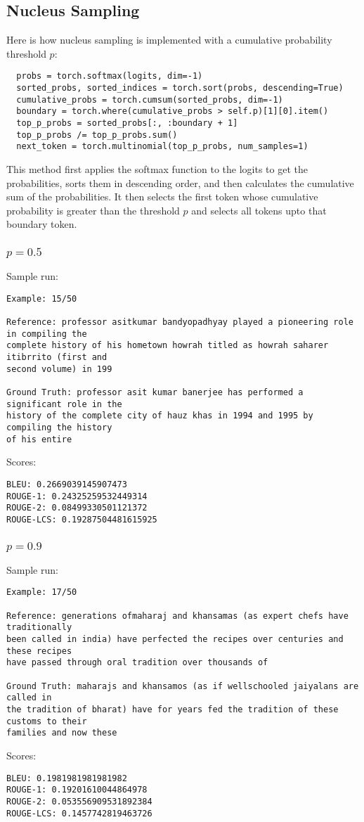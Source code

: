 \documentclass[a4paper,12pt]{article}
\begin{document}
\subsection{Nucleus Sampling}
Here is how nucleus sampling is implemented with a cumulative probability threshold $p$:
\begin{verbatim}
  probs = torch.softmax(logits, dim=-1)
  sorted_probs, sorted_indices = torch.sort(probs, descending=True)
  cumulative_probs = torch.cumsum(sorted_probs, dim=-1)
  boundary = torch.where(cumulative_probs > self.p)[1][0].item()
  top_p_probs = sorted_probs[:, :boundary + 1]
  top_p_probs /= top_p_probs.sum()  
  next_token = torch.multinomial(top_p_probs, num_samples=1)
\end{verbatim}
This method first applies the softmax function to the logits to get the probabilities,
sorts them in descending order, and then calculates the cumulative sum of the probabilities.
It then selects the first token whose cumulative probability is greater than the threshold $p$ and selects all tokens upto that boundary token.

\subsubsection{$p = 0.5$}
Sample run:
\begin{verbatim}
Example: 15/50

Reference: professor asitkumar bandyopadhyay played a pioneering role in compiling the
complete history of his hometown howrah titled as howrah saharer itibrrito (first and 
second volume) in 199

Ground Truth: professor asit kumar banerjee has performed a significant role in the
history of the complete city of hauz khas in 1994 and 1995 by compiling the history
of his entire

\end{verbatim}
Scores:
\begin{verbatim}
BLEU: 0.2669039145907473
ROUGE-1: 0.24325259532449314
ROUGE-2: 0.08499330501121372
ROUGE-LCS: 0.19287504481615925
\end{verbatim}

\subsubsection{$p = 0.9$}
Sample run:
\begin{verbatim}
Example: 17/50

Reference: generations ofmaharaj and khansamas (as expert chefs have traditionally
been called in india) have perfected the recipes over centuries and these recipes
have passed through oral tradition over thousands of

Ground Truth: maharajs and khansamos (as if wellschooled jaiyalans are called in
the tradition of bharat) have for years fed the tradition of these customs to their
families and now these

\end{verbatim}
Scores:
\begin{verbatim}
BLEU: 0.1981981981981982
ROUGE-1: 0.19201610044864978
ROUGE-2: 0.053556909531892384
ROUGE-LCS: 0.1457742819463726
\end{verbatim}
\end{document}
